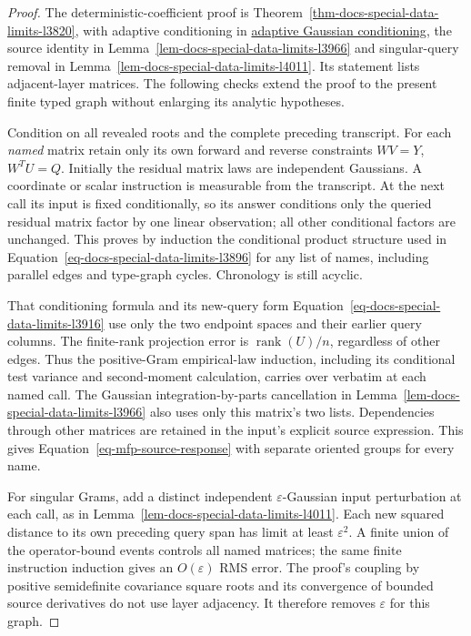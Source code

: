 \documentclass[
  11pt,
]{article}
\theoremstyle{definition}
\theoremstyle{plain}
\theoremstyle{plain}
\theoremstyle{plain}
\theoremstyle{remark}
\begin{document}
\begin{proof}
The deterministic-coefficient proof is
Theorem~\ref{thm-docs-special-data-limits-l3820}, with adaptive
conditioning in \hyperref[sec-docs-special-data-limits-l3884]{adaptive
Gaussian conditioning}, the source identity in
Lemma~\ref{lem-docs-special-data-limits-l3966} and singular-query
removal in Lemma~\ref{lem-docs-special-data-limits-l4011}. Its statement
lists adjacent-layer matrices. The following checks extend the proof to
the present finite typed graph without enlarging its analytic
hypotheses.

Condition on all revealed roots and the complete preceding transcript.
For each \emph{named} matrix retain only its own forward and reverse
constraints \(WV=Y\), \(W^TU=Q\). Initially the residual matrix laws are
independent Gaussians. A coordinate or scalar instruction is measurable
from the transcript. At the next call its input is fixed conditionally,
so its answer conditions only the queried residual matrix factor by one
linear observation; all other conditional factors are unchanged. This
proves by induction the conditional product structure used in
Equation~\ref{eq-docs-special-data-limits-l3896} for any list of names,
including parallel edges and type-graph cycles. Chronology is still
acyclic.

That conditioning formula and its new-query form
Equation~\ref{eq-docs-special-data-limits-l3916} use only the two
endpoint spaces and their earlier query columns. The finite-rank
projection error is \(\operatorname{rank}(U)/n\), regardless of other
edges. Thus the positive-Gram empirical-law induction, including its
conditional test variance and second-moment calculation, carries over
verbatim at each named call. The Gaussian integration-by-parts
cancellation in Lemma~\ref{lem-docs-special-data-limits-l3966} also uses
only this matrix's two lists. Dependencies through other matrices are
retained in the input's explicit source expression. This gives
Equation~\ref{eq-mfp-source-response} with separate oriented groups for
every name.

For singular Grams, add a distinct independent \(\varepsilon\)-Gaussian
input perturbation at each call, as in
Lemma~\ref{lem-docs-special-data-limits-l4011}. Each new squared
distance to its own preceding query span has limit at least
\(\varepsilon^2\). A finite union of the operator-bound events controls
all named matrices; the same finite instruction induction gives an
\(O(\varepsilon)\) RMS error. The proof's coupling by positive
semidefinite covariance square roots and its convergence of bounded
source derivatives do not use layer adjacency. It therefore removes
\(\varepsilon\) for this graph.


\end{proof}
\end{document}
